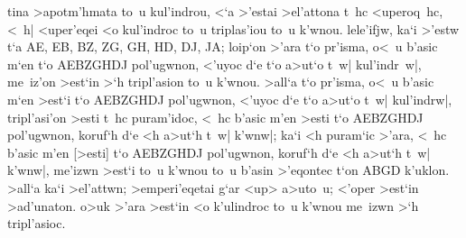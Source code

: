 \begin{Parallel}{}{}
{{tina >apotm'hmata to~u kul'indrou, <`a >'estai >el'attona t~hc <uperoq~hc, <~h| <uper'eqei <o kul'indroc to~u
triplas'iou to~u k'wnou. lele'ifjw, ka`i >'estw t`a AE, EB, BZ, ZG, GH, HD, DJ, JA; loip`on >'ara t`o pr'isma, o<~u
b'asic m`en t`o AEBZGHDJ pol'ugwnon, <'uyoc d`e t`o a>ut`o t~w| kul'indr~w|, me~iz'on >est`in >`h
tripl'asion to~u k'wnou. 
>all`a t`o pr'isma, o<~u b'asic m`en >est`i t`o AEBZGHDJ pol'ugwnon, <'uyoc d`e t`o a>ut`o t~w| kul'indrw|, tripl'asi'on
>esti t~hc puram'idoc, <~hc b'asic m'en >esti t`o AEBZGHDJ
pol'ugwnon, 
koruf`h d`e
<h a>ut`h t~w| k'wnw|; ka`i <h puram`ic >'ara, <~hc b'asic m'en [>esti] t`o AEBZGHDJ pol'ugwnon, koruf`h
d`e <h a>ut`h t~w| k'wnw|, me'izwn >est`i to~u k'wnou to~u b'asin >'eqontec t`on ABGD k'uklon.
 >all`a ka`i
>el'attwn; >emperi'eqetai g`ar <up> a>uto~u; <'oper >est`in >ad'unaton. o>uk >'ara >est`in <o k'ulindroc
to~u k'wnou me~izwn >`h tripl'asioc.}


}
\end{Parallel}
